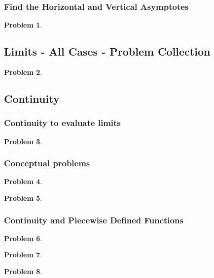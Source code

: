 \documentclass{article}
\newtheorem{problem}{Problem}
\begin{document}
\subsubsection{Find the Horizontal and Vertical Asymptotes}\label{secMPShorAndVertAsymptotes}
\begin{problem}

\end{problem}


\subsection{Limits - All Cases - Problem Collection}
\begin{problem}

\end{problem}
\subsection{Continuity}
\subsubsection{Continuity to evaluate limits}
\begin{problem}

\end{problem}

\subsubsection{Conceptual problems} \label{secMPScontinuityConceptual}
\begin{problem}

\end{problem}
\begin{problem}

\end{problem}
\subsubsection{Continuity and Piecewise Defined Functions} \label{secMPScontinuityPiecewise}
\begin{problem}

\end{problem}
\begin{problem}

\end{problem}
\begin{problem}

\end{problem}
\end{document}
